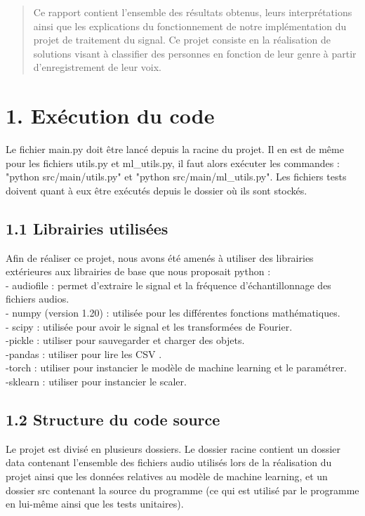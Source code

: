 \documentclass[a4paper,12pt]{report}	%
\begin{document}
\umonsCoverPage		%
	

\begin{abstract}
Ce rapport contient l'ensemble des résultats obtenus, leurs interprétations ainsi que les explications du fonctionnement de notre implémentation du projet de traitement du signal. Ce projet consiste en la réalisation de solutions visant à classifier des personnes en fonction de leur genre à partir d'enregistrement de leur voix.
\end{abstract}

\clearpage		
\tableofcontents

\clearpage		
{}

{\section*{1. Exécution du code}}
Le fichier main.py doit être lancé depuis la racine du projet. Il en est de même pour les fichiers utils.py et ml\_utils.py, il faut alors exécuter les commandes : "python src/main/utils.py" et "python src/main/ml\_utils.py". Les fichiers tests doivent quant à eux être exécutés depuis le dossier où ils sont stockés.
{\subsection*{1.1 Librairies utilisées}}
Afin de réaliser ce projet, nous avons été amenés à utiliser des librairies extérieures aux librairies de base que nous proposait python :\\
- audiofile : permet d'extraire le signal et la fréquence d'échantillonnage des fichiers audios.\\
- numpy (version 1.20) : utilisée pour les différentes fonctions mathématiques. \\
- scipy : utilisée pour avoir le signal et les transformées de Fourier. \\
-pickle : utiliser pour sauvegarder et charger des objets. \\
-pandas : utiliser pour lire les CSV .\\
-torch : utiliser pour instancier le modèle de machine learning et le paramétrer. \\
-sklearn : utiliser pour instancier le scaler. \\
{\subsection*{1.2 Structure du code source}}
Le projet est divisé en plusieurs dossiers. Le dossier racine contient un dossier data contenant l'ensemble des fichiers audio utilisés lors de la réalisation du projet ainsi que les données relatives au modèle de machine learning, et un dossier src contenant la source du programme (ce qui est utilisé par le programme en lui-même ainsi que les tests unitaires).
\end{document}
